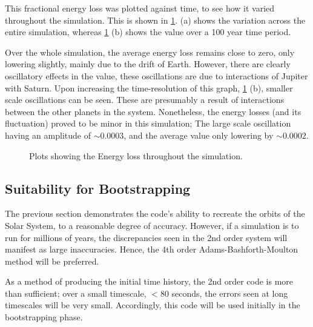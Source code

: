 \documentclass[a4paper,10pt]{article}
\begin{document}
This fractional energy loss was plotted against time, to see how it varied throughout the simulation. This is shown in \cref{Energy}.  (a) shows the variation across the entire simulation, whereas \cref{Energy} (b) shows the value over a 100 year time period. 

Over the whole simulation, the average energy loss remains close to zero, only lowering slightly, mainly due to the drift of Earth. However, there are clearly oscillatory effects in the value, these oscillations are due to interactions of Jupiter with Saturn. Upon increasing the time-resolution of this graph, \cref{Energy} (b), smaller scale oscillations can be seen. These are presumably a result of interactions between the other planets in the system. Nonetheless, the energy losses (and its fluctuation) proved to be minor in this simulation; The large scale oscillation having an amplitude of $\sim 0.0003$, and the average value only lowering by $\sim 0.0002$.

\begin{figure}[h!]
    \centering
    \qquad
    \caption{Plots showing the Energy loss throughout the simulation.}%
    \label{Energy}%
\end{figure}

\subsection{Suitability for Bootstrapping}\label{Suitable}

The previous section demonstrates the code's ability to recreate the orbits of the Solar System, to a reasonable degree of accuracy. However, if a simulation is to run for millions of years, the discrepancies seen in the 2nd order system will manifest as large inaccuracies. Hence, the 4th order Adams-Bashforth-Moulton method will be preferred.

As a method of producing the initial time history, the 2nd order code is more than sufficient; over a small timescale, $<80$ seconds, the errors seen at long timescales will be very small. Accordingly, this code will be used initially in the bootstrapping phase.   \pagebreak
\end{document}
